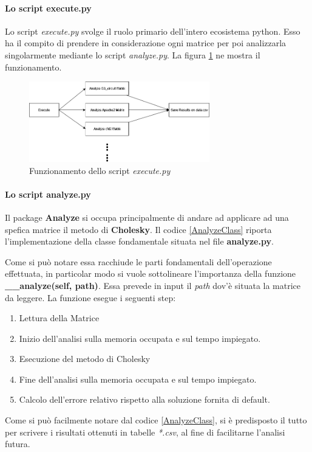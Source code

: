 \paragraph{Lo script execute.py}
Lo script \textit{execute.py} svolge il ruolo primario dell'intero ecosistema python. Esso ha il compito di prendere in considerazione ogni matrice per poi analizzarla singolarmente mediante lo script \textit{analyze.py}. La figura \ref{fig:execute.py} ne mostra il funzionamento.
\begin{figure}[h!]
    \centering
    \includegraphics[width=0.7\textwidth]{figs/execute.drawio.png}
    \caption{Funzionamento dello script \textit{execute.py}}
    \label{fig:execute.py}
\end{figure}

\paragraph{Lo script analyze.py}
Il package \textbf{Analyze} si occupa principalmente di andare ad applicare ad una spefica matrice il metodo di \textbf{Cholesky}. Il codice \ref{AnalyzeClass} riporta l'implementazione della classe fondamentale situata nel file \textbf{analyze.py}.



Come si può notare essa racchiude le parti fondamentali dell'operazione effettuata, in particolar modo si vuole sottolineare l'importanza della funzione \textbf{\_\_analyze(self, path)}. Essa prevede in input il \textit{path} dov'è situata la matrice da leggere. La funzione esegue i seguenti step:
\begin{enumerate}
    \item Lettura della Matrice
    \item Inizio dell'analisi sulla memoria occupata e sul tempo impiegato.
    \item Esecuzione del metodo di Cholesky
    \item Fine dell'analisi sulla memoria occupata e sul tempo impiegato.
    \item Calcolo dell'errore relativo rispetto alla soluzione fornita di default.
\end{enumerate}
Come si può facilmente notare dal codice \ref{AnalyzeClass}, si è predisposto il tutto per scrivere i risultati ottenuti in tabelle \textit{*.csv}, al fine di facilitarne l'analisi futura.

